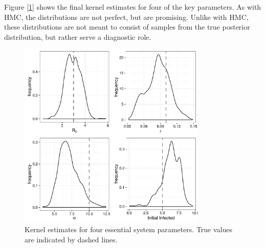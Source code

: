 	Figure [\ref{if2kernelplot}] shows the final kernel estimates for four of the key parameters. As with HMC, the distributions are not perfect, but are promising. Unlike with HMC, these distributions are not meant to consist of samples from the true posterior distribution, but rather serve a diagnostic role.

    \begin{figure}
        \centering
        \captionsetup{width=0.8\linewidth}
        \includegraphics[width=0.8\textwidth]{./images/if2kernels.pdf}
        \caption{Kernel estimates for four essential system parameters. True values are indicated by dashed lines. \label{if2kernelplot}}
    \end{figure}
